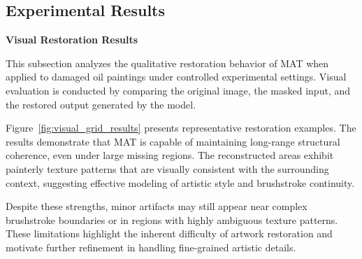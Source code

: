 \documentclass[12pt, twoside]{report}
\begin{document}

\subsection{Experimental Results}
\label{sec:experimental_results}

\noindent\textbf{Visual Restoration Results}

This subsection analyzes the qualitative restoration behavior of MAT when applied to
damaged oil paintings under controlled experimental settings. Visual evaluation is
conducted by comparing the original image, the masked input, and the restored output
generated by the model.

Figure~\ref{fig:visual_grid_results} presents representative restoration examples. The results
demonstrate that MAT is capable of maintaining long-range structural coherence, even
under large missing regions. The reconstructed areas exhibit painterly texture patterns
that are visually consistent with the surrounding context, suggesting effective modeling
of artistic style and brushstroke continuity.

Despite these strengths, minor artifacts may still appear near complex brushstroke
boundaries or in regions with highly ambiguous texture patterns. These limitations
highlight the inherent difficulty of artwork restoration and motivate further refinement
in handling fine-grained artistic details.
\end{document}
